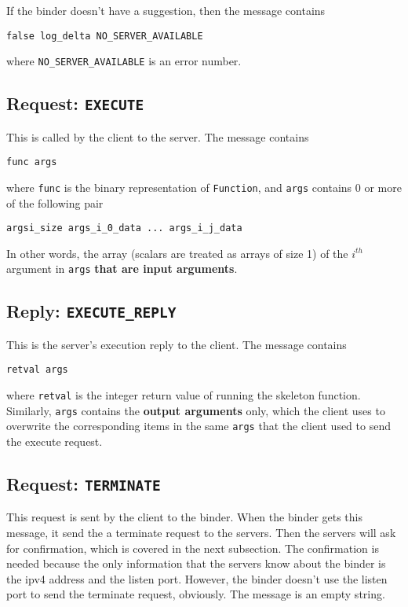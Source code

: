 If the binder doesn't have a suggestion, then the message contains
\begin{verbatim}
false log_delta NO_SERVER_AVAILABLE
\end{verbatim}
where {\tt NO\_SERVER\_AVAILABLE} is an error number.

\subsection{Request: \tt EXECUTE}
This is called by the client to the server.
The message contains
\begin{verbatim}
func args
\end{verbatim}
where {\tt func} is the binary representation of {\tt Function}, and {\tt args} contains 0 or more of the following pair
\begin{verbatim}
argsi_size args_i_0_data ... args_i_j_data
\end{verbatim}
In other words, the array (scalars are treated as arrays of size 1) of the $i^{th}$ argument in {\tt args} {\bf that are input arguments}.

\subsection{Reply: \tt EXECUTE\_REPLY}
This is the server's execution reply to the client.
The message contains
\begin{verbatim}
retval args
\end{verbatim}
where {\tt retval} is the integer return value of running the skeleton function.
Similarly, {\tt args} contains the {\bf output arguments} only, which the client uses to overwrite the corresponding items in the same {\tt args} that the client used to send the execute request.

\subsection{Request: \tt TERMINATE}
This request is sent by the client to the binder.
When the binder gets this message, it send the a terminate request to the servers.
Then the servers will ask for confirmation, which is covered in the next subsection.
The confirmation is needed because the only information that the servers know about the binder is the ipv4 address and the listen port.
However, the binder doesn't use the listen port to send the terminate request, obviously.
The message is an empty string.


